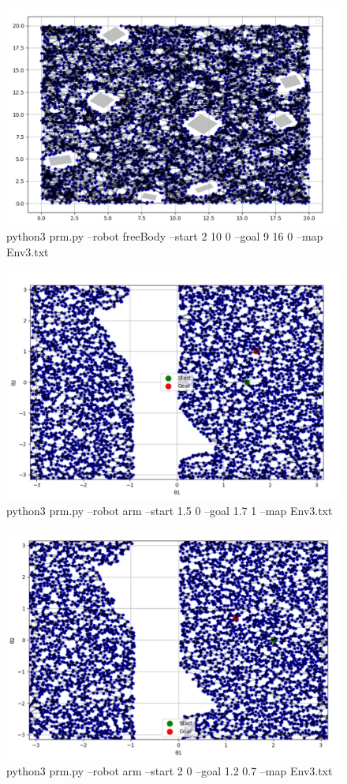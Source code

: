 \documentclass{article}
\begin{document}
\begin{figure} [H]
    \centering
    \includegraphics[width=0.7\linewidth]{latex_media/prm_freebody_env3_conf2.png}
    \caption{python3 prm.py --robot freeBody --start 2 10 0 --goal 9 16 0 --map Env3.txt}
\end{figure}

\begin{figure} [H]
    \centering
    \includegraphics[width=0.7\linewidth]{latex_media/prm_arm_env3_conf1.png}
    \caption{python3 prm.py --robot arm --start 1.5 0 --goal 1.7 1 --map Env3.txt}
\end{figure}

\begin{figure} [H]
    \centering
    \includegraphics[width=0.7\linewidth]{latex_media/prm_arm_env3_conf2.png}
    \caption{python3 prm.py --robot arm --start 2 0 --goal 1.2 0.7 --map Env3.txt}
\end{figure}
\end{document}
